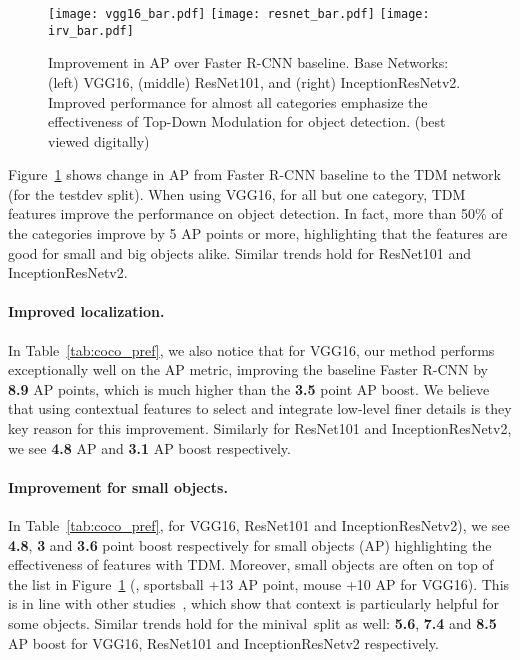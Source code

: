 \documentclass[10pt,twocolumn,letterpaper]{article}
\newcommand{\minival}{minival\raisebox{0.2ex}{}}
\begin{document}
\begin{figure}
    \centering
    \texttt{[image: vgg16\_bar.pdf]} 
    \texttt{[image: resnet\_bar.pdf]} 
    \texttt{[image: irv\_bar.pdf]} 
    \caption{Improvement in AP over Faster R-CNN baseline. Base Networks: (left) VGG16, (middle) ResNet101, and (right) InceptionResNetv2. Improved performance for almost all categories emphasize the effectiveness of Top-Down Modulation for object detection. (best viewed digitally)}
    \label{fig:distribution}
    \vspace{-0.1in}
\end{figure}


Figure~\ref{fig:distribution} shows change in AP from Faster R-CNN baseline to the TDM network (for the testdev split). When using VGG16, for all but one category, TDM features improve the performance on object detection. In fact, more than 50\% of the categories improve by 5 AP points or more, highlighting that the features are good for small and big objects alike. Similar trends hold for ResNet101 and InceptionResNetv2.

\vspace{-0.1in}
\paragraph{Improved localization.} In Table~\ref{tab:coco_pref}, we also notice that for VGG16, our method performs exceptionally well on the AP metric, improving the baseline Faster R-CNN by \textbf{8.9} AP points, which is much higher than the \textbf{3.5} point AP boost. We believe that using contextual features to select and integrate low-level finer details is they key reason for this improvement. Similarly for ResNet101 and InceptionResNetv2, we see \textbf{4.8} AP and \textbf{3.1} AP boost respectively.

\vspace{-0.1in}
\paragraph{Improvement for small objects.} In Table~\ref{tab:coco_pref}, for VGG16, ResNet101 and InceptionResNetv2), we see \textbf{4.8}, \textbf{3} and \textbf{3.6} point boost respectively for small objects (AP) highlighting the effectiveness of features with TDM. Moreover, small objects are often on top of the list in Figure~\ref{fig:distribution} (\eg, sportsball +13 AP point, mouse +10 AP for VGG16). This is in line with other studies~\cite{gupta2015exploring}, which show that context is particularly helpful for some objects. Similar trends hold for the \minival\ split as well: \textbf{5.6}, \textbf{7.4} and \textbf{8.5} AP  boost for VGG16, ResNet101 and InceptionResNetv2 respectively.
\end{document}
